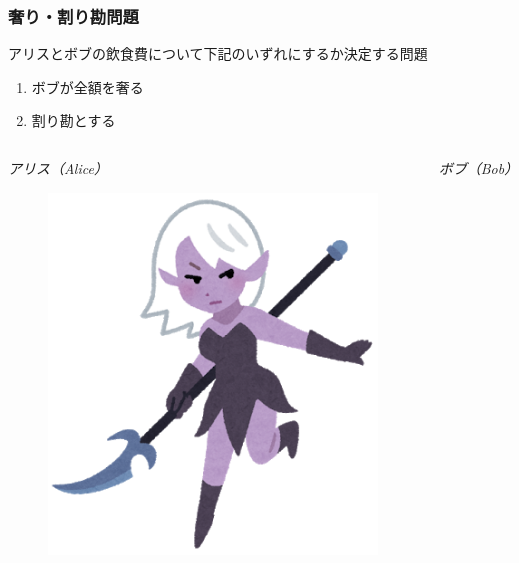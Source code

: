 \begin{frame}
  \frametitle{奢り・割り勘問題}

  \begin{shadequote}[r]{}
    アリスとボブの飲食費について下記のいずれにするか決定する問題
    \begin{enumerate}
      \item ボブが全額を奢る
      \item 割り勘とする
    \end{enumerate}
  \end{shadequote}

  \begin{columns}
    \begin{column}{0.5\textwidth}
      \centering
      \emph{アリス（Alice）}

      \begin{figure}[h]
        \includegraphics[height=0.35\textheight]{img/alice.png}
      \end{figure}
    \end{column}
   
    \begin{column}{0.5\textwidth}
      \centering
      \emph{ボブ（Bob）}


\end{column}
\end{columns}
\end{frame}
